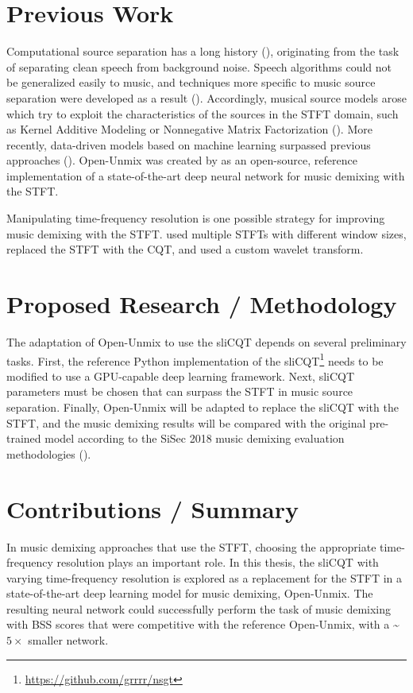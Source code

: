 \documentclass[letter,12pt]{article}
\begin{document}
\section{Previous Work}

Computational source separation has a long history (\cite{musicsepgood}), originating from the task of separating clean speech from background noise. Speech algorithms could not be generalized easily to music, and techniques more specific to music source separation were developed as a result (\cite{musicseptechniques1}). Accordingly, musical source models arose which try to exploit the characteristics of the sources in the STFT domain, such as Kernel Additive Modeling or Nonnegative Matrix Factorization (\cite{musicsepgood}). More recently, data-driven models based on machine learning surpassed previous approaches (\cite{sisec2018}). Open-Unmix was created by \textcite{umx} as an open-source, reference implementation of a state-of-the-art deep neural network for music demixing with the STFT.

Manipulating time-frequency resolution is one possible strategy for improving music demixing with the STFT. \textcite{driedger} used multiple STFTs with different window sizes, \textcite{fitzgerald2} replaced the STFT with the CQT, and \textcite{wavelets} used a custom wavelet transform.

\section{Proposed Research / Methodology}

The adaptation of Open-Unmix to use the sliCQT depends on several preliminary tasks. First, the reference Python implementation of the sliCQT\footnote{\url{https://github.com/grrrr/nsgt}} needs to be modified to use a GPU-capable deep learning framework. Next, sliCQT parameters must be chosen that can surpass the STFT in music source separation. Finally, Open-Unmix will be adapted to replace the sliCQT with the STFT, and the music demixing results will be compared with the original pre-trained model according to the SiSec 2018 music demixing evaluation methodologies (\cite{sisec2018}).

\section{Contributions / Summary}

In music demixing approaches that use the STFT, choosing the appropriate time-frequency resolution plays an important role. In this thesis, the sliCQT with varying time-frequency resolution is explored as a replacement for the STFT in a state-of-the-art deep learning model for music demixing, Open-Unmix. The resulting neural network could successfully perform the task of music demixing with BSS scores that were competitive with the reference Open-Unmix, with a \textasciitilde$5 \times$ smaller network.

\vfill
\clearpage %

\printbibheading[title={References},heading=bibnumbered]
\printbibliography[heading=none]

\vfill
\clearpage %
\end{document}
